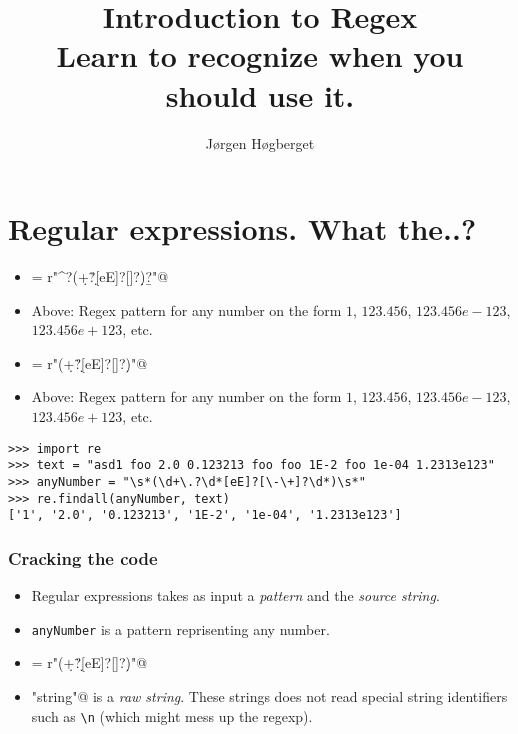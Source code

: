 \documentclass{beamer}
\title[Regex - for the people!]{Introduction to Regex\\Learn to recognize when you should use it.}
\author{Jørgen Høgberget}
\date{}
\begin{document}
\begin{frame}
\titlepage
\end{frame}


\section{Regular expressions. What the..?}

\begin{frame}[fragile]
\scriptsize
\begin{itemize}
 \item \verb@anyNumber = r"^?\s*(\d+\.?\d*[eE]?[\-\+]?\d*)\s*\b?"@
\pause \item Above: Regex pattern for any number on the form $1$, $123.456$, $123.456e-123$, $123.456e+123$, etc.
\end{itemize}
\end{frame}

\begin{frame}[fragile]
\scriptsize
\begin{itemize}
 \item \verb@anyNumber = r"\s*(\d+\.?\d*[eE]?[\-\+]?\d*)\s*"@
\pause \item Above: Regex pattern for any number on the form $1$, $123.456$, $123.456e-123$, $123.456e+123$, etc.
\end{itemize}
\end{frame}

\begin{frame}[fragile]
\scriptsize
\begin{verbatim}
>>> import re
>>> text = "asd1 foo 2.0 0.123213 foo foo 1E-2 foo 1e-04 1.2313e123" 
>>> anyNumber = "\s*(\d+\.?\d*[eE]?[\-\+]?\d*)\s*"
>>> re.findall(anyNumber, text)
['1', '2.0', '0.123213', '1E-2', '1e-04', '1.2313e123']
\end{verbatim}
\normalsize
\end{frame}

\begin{frame}[fragile]
\frametitle{Cracking the code}
\scriptsize
\begin{itemize}
 \item Regular expressions takes as input a \textit{pattern} and the \textit{source string}.
 \pause \item \verb+anyNumber+ is a pattern reprisenting any number.
 \item \verb@anyNumber = r"\s*(\d+\.?\d*[eE]?[\-\+]?\d*)\s*"@
 \pause \item \verb@r"string"@ is a \textit{raw string}. These strings does not read special string identifiers such as \verb+\n+ (which might mess up the regexp).
\end{itemize}
\normalsize
\end{frame}
\end{document}
